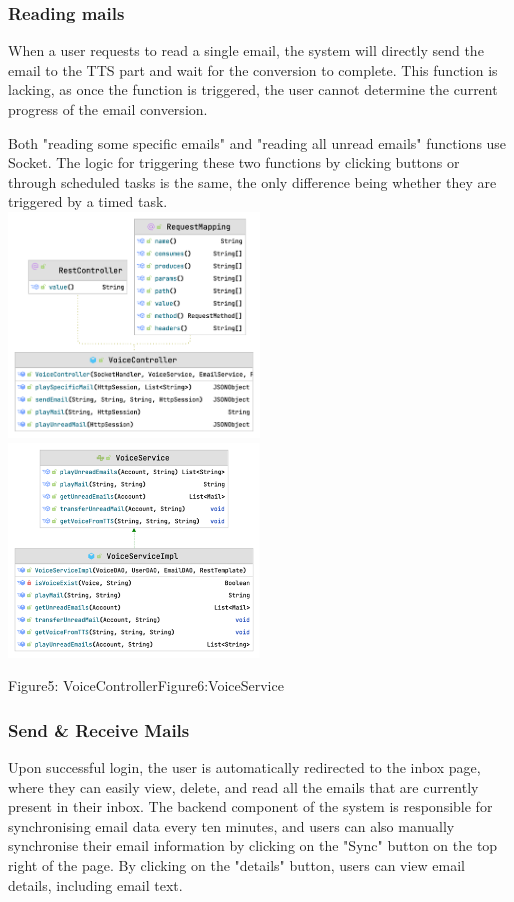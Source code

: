 \documentclass{article}
\begin{document}
\subsubsection{Reading mails}
When a user requests to read a single email, the system will directly send the email to the TTS part and wait for the conversion to complete. This function is lacking, as once the function is triggered, the user cannot determine the current progress of the email conversion.

Both "reading some specific emails" and "reading all unread emails" functions use Socket. The logic for triggering these two functions by clicking buttons or through scheduled tasks is the same, the only difference being whether they are triggered by a timed task.\\
\includegraphics[width=0.5\textwidth]{VoiceController.png}
\includegraphics[width=0.5\textwidth]{VoiceService.png}
\begin{center}
Figure5: VoiceController\hspace{6cm}Figure6:VoiceService
\end{center}

\subsubsection{Send \& Receive Mails}
Upon successful login, the user is automatically redirected to the inbox page, where they can easily view, delete, and read all the emails that are currently present in their inbox. The backend component of the system is responsible for synchronising email data every ten minutes, and users can also manually synchronise their email information by clicking on the "Sync" button on the top right of the page. By clicking on the "details" button, users can view email details, including email text.
\end{document}
